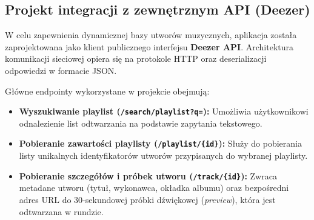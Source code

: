 \subsection{Projekt integracji z zewnętrznym API (Deezer)}

\hspace{0.60cm}W celu zapewnienia dynamicznej bazy utworów muzycznych, aplikacja została zaprojektowana jako klient publicznego interfejsu \textbf{Deezer API}. Architektura komunikacji sieciowej opiera się na protokole HTTP oraz deserializacji odpowiedzi w formacie JSON. 

Główne endpointy wykorzystane w projekcie obejmują:
\begin{itemize}
    \item \textbf{Wyszukiwanie playlist (\texttt{/search/playlist?q=}):} Umożliwia użytkownikowi odnalezienie list odtwarzania na podstawie zapytania tekstowego.
    \item \textbf{Pobieranie zawartości playlisty (\texttt{/playlist/\{id\}}):} Służy do pobierania listy unikalnych identyfikatorów utworów przypisanych do wybranej playlisty.
    \item \textbf{Pobieranie szczegółów i próbek utworu (\texttt{/track/\{id\}}):} Zwraca metadane utworu (tytuł, wykonawca, okładka albumu) oraz bezpośredni adres URL do 30-sekundowej próbki dźwiękowej (\textit{preview}), która jest odtwarzana w rundzie.
\end{itemize}